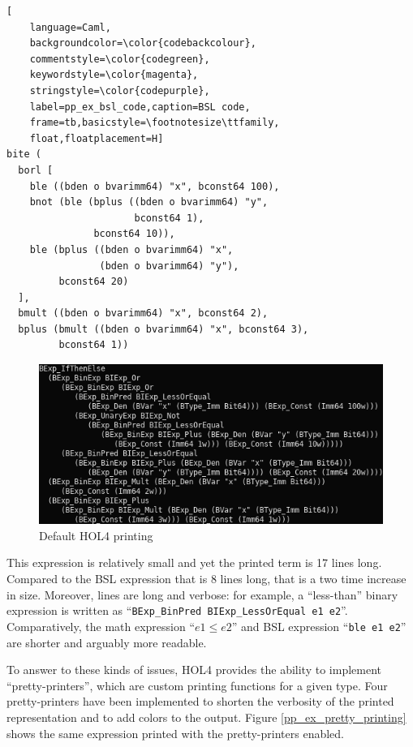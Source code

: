 \documentclass{kththesis}
\begin{document}
\begin{lstlisting}[
    language=Caml,
    backgroundcolor=\color{codebackcolour},
    commentstyle=\color{codegreen},
    keywordstyle=\color{magenta},
    stringstyle=\color{codepurple},
    label=pp_ex_bsl_code,caption=BSL code,
    frame=tb,basicstyle=\footnotesize\ttfamily,
    float,floatplacement=H]
bite (
  borl [
    ble ((bden o bvarimm64) "x", bconst64 100),
    bnot (ble (bplus ((bden o bvarimm64) "y",
                      bconst64 1),
               bconst64 10)),
    ble (bplus ((bden o bvarimm64) "x",
                (bden o bvarimm64) "y"),
         bconst64 20)
  ],
  bmult ((bden o bvarimm64) "x", bconst64 2),
  bplus (bmult ((bden o bvarimm64) "x", bconst64 3),
         bconst64 1))
\end{lstlisting}

\begin{figure}[!h]
	\includegraphics[width=\textwidth]{figures/pp_ex_default_printing.png}
	\centering
	\caption{Default HOL4 printing}
	\label{pp_ex_default_printing}
\end{figure}

This expression is relatively small and yet the printed term is 17 lines long. Compared to the BSL expression that is 8 lines long\footnotemark, that is a two time increase in size. Moreover, lines are long and verbose: for example, a ``less-than'' binary expression is written as ``\texttt{BExp\_BinPred BIExp\_LessOrEqual e1 e2}''. Comparatively, the math expression ``$e1 \leq e2$'' and BSL expression ``\texttt{ble e1 e2}'' are shorter and arguably more readable.


To answer to these kinds of issues, HOL4 provides the ability to implement ``pretty-printers'', which are custom printing functions for a given type. Four pretty-printers have been implemented to shorten the verbosity of the printed representation and to add colors to the output. Figure \ref{pp_ex_pretty_printing} shows the same expression printed with the pretty-printers enabled.
\end{document}
